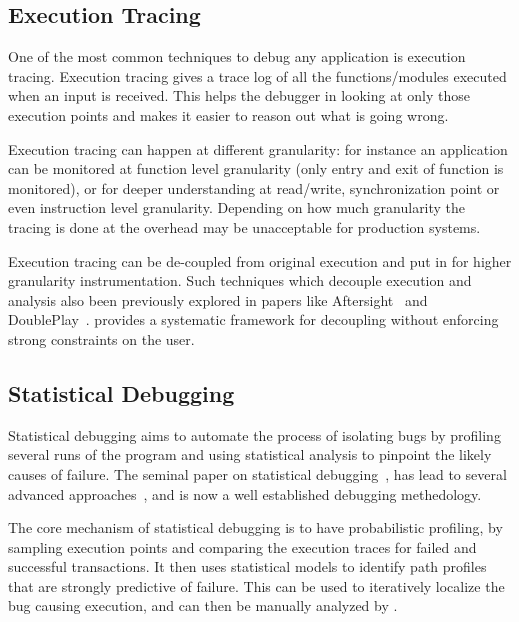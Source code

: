 \subsection{Execution Tracing}
\label{sec:activeExecutionTracing}

One of the most common techniques to debug any application is execution tracing. 
Execution tracing gives a trace log of all the functions/modules executed when an input is received. 
This helps the debugger in looking at only those execution points and makes it easier to reason out what is going wrong.

Execution tracing can happen at different granularity: for instance an application can be monitored at function level granularity (only entry and exit of function is monitored), or for deeper understanding at read/write, synchronization point or even instruction level granularity.
Depending on how much granularity the tracing is done at the overhead may be unacceptable for production systems.

Execution tracing can be de-coupled from original execution and put in \debugcontainer for higher granularity instrumentation. 
Such techniques which decouple execution and analysis also been previously explored in papers like Aftersight~\cite{aftersight} and DoublePlay~\cite{doubleplay}.
\parikshan provides a systematic framework for decoupling without enforcing strong constraints on the user.

\subsection{Statistical Debugging}
\label{sec:activeStatisticalDebugging}

Statistical debugging aims to automate the process of isolating bugs by profiling several runs of the program and using statistical analysis to pinpoint the likely causes of failure. 
The seminal paper on statistical debugging~\cite{statisticalDebugging}, has lead to several advanced approaches~\cite{holmes,adaptive,statisticalPerformance}, and is now a well established debugging methedology. 

The core mechanism of statistical debugging is to have probabilistic profiling, by sampling execution points and comparing the execution traces for failed and successful transactions.
It then uses statistical models to identify path profiles that are strongly predictive of failure. 
This can be used to iteratively localize the bug causing execution, and can then be manually analyzed by \parikshan.

